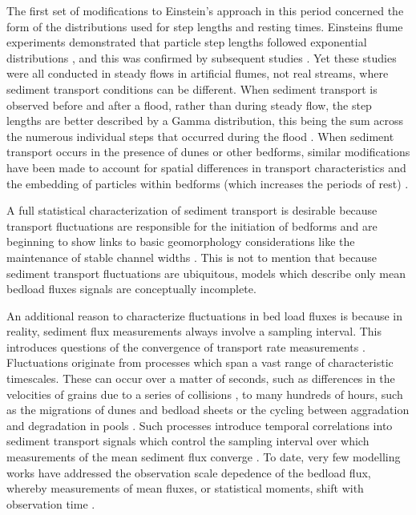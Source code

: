 The first set of modifications to Einstein's approach in this period concerned the form of the distributions used for step lengths and resting times. Einsteins flume experiments demonstrated that particle step lengths followed exponential distributions \citep{1937}, and this was confirmed by subsequent studies \citep{Yano1969, Nakagawa1976}. Yet these studies were all conducted in steady flows in artificial flumes, not real streams, where sediment transport conditions can be different. When sediment transport is observed before and after a flood, rather than during steady flow, the step lengths are better described by a Gamma distribution, this being the sum across the numerous individual steps that occurred during the flood \citep{Hassan1991}. When sediment transport occurs in the presence of dunes or other bedforms, similar modifications have been made to account for spatial differences in transport characteristics \citep{Crickmore1962, Hubbell1964, Sayre1965} and the embedding of particles within bedforms (which increases the periods of rest) \citep{Yang1971,Nakagawa1980}.

A full statistical characterization of sediment transport is desirable because transport fluctuations are responsible for the initiation of bedforms \citep{Jerolmack2005,Bohorquez2016} and are beginning to show links to basic geomorphology considerations like the maintenance of stable channel widths \citep{Abramian2019,Abramian2020}.
This is not to mention that because sediment transport fluctuations are ubiquitous, models which describe only mean bedload fluxes signals are conceptually incomplete.

An additional reason to characterize fluctuations in bed load fluxes is because in reality, sediment flux measurements always involve a sampling interval.
This introduces questions of the convergence of transport rate measurements \citep{Dhont2018,Ancey2020}.
Fluctuations originate from processes which span a vast range of characteristic timescales.
These can occur over a matter of seconds, such as differences in the velocities of grains due to a series of collisions \citep{Benavides2021}, to many hundreds of hours, such as the migrations of dunes and bedload sheets \citep{Hammamori1962,Hoey1992,Guala2014} or the cycling between aggradation and degradation in pools \citep{Dhont2018}.
Such processes introduce temporal correlations into sediment transport signals which control the sampling interval over which measurements of the mean sediment flux converge \citep{Saletti2015,Singh2009,Singh2012}.
To date, very few modelling works have addressed the observation scale depedence of the bedload flux, whereby measurements of mean fluxes, or statistical moments, shift with observation time \citep{Ancey2020}.


